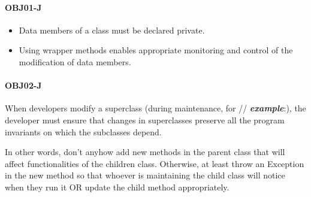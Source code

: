 \documentclass[a4paper]{article}
\begin{document}
\paragraph{OBJ01-J}
\begin{itemize}
	\item Data members of a class must be declared private.
	\item Using wrapper methods enables appropriate monitoring and control of the modification of data members.
\end{itemize}
\paragraph{OBJ02-J}
When developers modify a superclass (during maintenance, for // \textbf{\textit{example}}:), the developer must ensure that changes in superclasses preserve all the program invariants on which the subclasses depend.
\begin{framed}
	\begin{displayquote}
		In other words, don't anyhow add new methods in the parent class that will affect functionalities of the children class. Otherwise, at least throw an Exception in the new method so that whoever is maintaining the child class will notice when they run it OR update the child method appropriately.
	\end{displayquote}
\end{framed}
\end{document}
